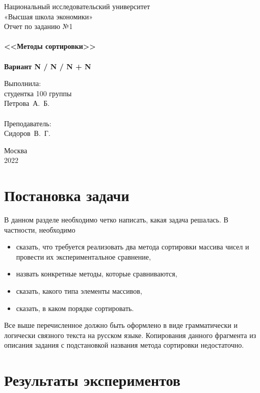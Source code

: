 \documentclass[a4paper,12pt,titlepage,draft]{article}
\newcommand{\university}{Национальный исследовательский университет\\
«Высшая школа экономики»}
\begin{document}
\begin{titlepage}
    \begin{center}
	{\large \sc \university\\}
	\vfill
	{\Large \sc Отчет по заданию №1}\\
	~\\
	{\large \bf <<Методы сортировки>>}\\
	~\\
	{\large \bf Вариант N / N / N + N}
    \end{center}
    \begin{flushright}
	\vfill {Выполнила:\\
	студентка 100 группы\\
	Петрова~А.~Б.\\
	~\\
	Преподаватель:\\
	Сидоров~В.~Г.}
    \end{flushright}
    \begin{center}
	\vfill
	{\small Москва\\2022}
    \end{center}
\end{titlepage}

\tableofcontents
\newpage

\section{Постановка задачи}

В данном разделе необходимо четко написать, какая задача решалась. В частности,
необходимо
\begin{itemize}
    \item сказать, что требуется реализовать два метода сортировки массива чисел
	и провести их экспериментальное сравнение,
    \item назвать конкретные методы, которые сравниваются,
    \item сказать, какого типа элементы массивов,
    \item сказать, в каком порядке сортировать.
\end{itemize}
Все выше перечисленное должно быть оформлено в виде грамматически и логически
связного текста на русском языке. Копирования данного фрагмента из описания
задания с подстановкой названия метода сортировки недостаточно.

\newpage

\section{Результаты экспериментов}
\end{document}
